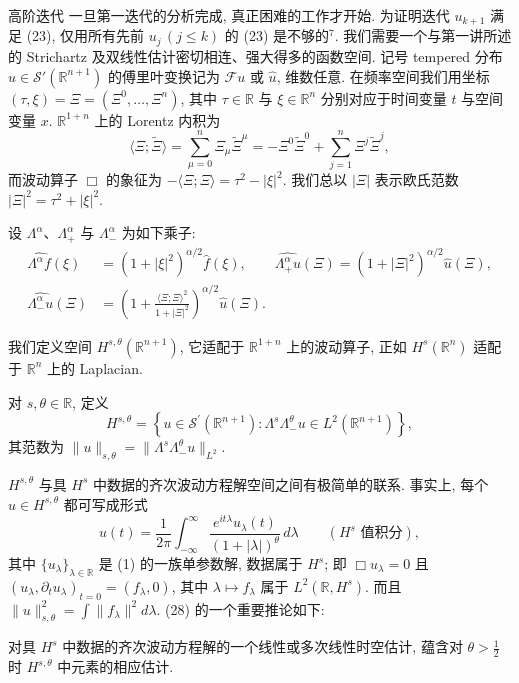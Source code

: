 高阶迭代 一旦第一迭代的分析完成, 真正困难的工作才开始. 为证明迭代 $u_{k+1}$ 满足 (23), 仅用所有先前 $u_j\,(j \leq k)$ 的 (23) 是不够的$^{7}$. 我们需要一个与第一讲所述的 Strichartz 及双线性估计密切相连、强大得多的函数空间.
记号  tempered 分布 $u \in \mathcal{S}'(\mathbb{R}^{n+1})$ 的傅里叶变换记为 $\mathcal{F}u$ 或 $\widehat{u}$, 维数任意. 在频率空间我们用坐标 $(\tau, \xi) = \Xi = (\Xi^0, \ldots, \Xi^n)$, 其中 $\tau \in \mathbb{R}$ 与 $\xi \in \mathbb{R}^n$ 分别对应于时间变量 $t$ 与空间变量 $x$. $\mathbb{R}^{1+n}$ 上的 Lorentz 内积为
\[
\langle\Xi;\widetilde{\Xi}\rangle=\sum_{\mu=0}^{n}\Xi_{\mu}\widetilde{\Xi}^{\mu}=-\Xi^{0}\widetilde{\Xi}^{0}+\sum_{j=1}^{n}\Xi^{j}\widetilde{\Xi}^{j},
\]
而波动算子 $\Box$ 的象征为 $-\langle \Xi;\Xi\rangle = \tau^2 - |\xi|^2$. 我们总以 $|\Xi|$ 表示欧氏范数 $|\Xi|^2 = \tau^2 + |\xi|^2$.
\begin{definition}\label{def:2.8}
设 $\Lambda^{\alpha}$、$\Lambda_{+}^{\alpha}$ 与 $\Lambda_{-}^{\alpha}$ 为如下乘子:
\begin{align}
\widehat{\Lambda^{\alpha}f}(\xi)&=\left(1+|\xi|^{2}\right)^{\alpha/2}\widehat{f}(\xi),\qquad
\widehat{\Lambda_{+}^{\alpha}u}(\Xi)=\left(1+|\Xi|^{2}\right)^{\alpha/2}\widehat{u}(\Xi),\nonumber\\
\widehat{\Lambda_{-}^{\alpha}u}(\Xi)&=\left(1+\frac{\langle\Xi;\Xi\rangle^{2}}{1+|\Xi|^{2}}\right)^{\alpha/2}\widehat{u}(\Xi).\end{align}
\end{definition}

我们定义空间 $H^{s,\theta}(\mathbb{R}^{n+1})$, 它适配于 $\mathbb{R}^{1+n}$ 上的波动算子, 正如 $H^{s}(\mathbb{R}^{n})$ 适配于 $\mathbb{R}^{n}$ 上的 Laplacian.
\begin{definition}\label{def:2.9}
对 $s, \theta \in \mathbb{R}$, 定义
\[
H^{s,\theta}=\left\{u\in\mathcal{S}^{\prime}(\mathbb{R}^{n+1}):\Lambda^{s}\Lambda_{-}^{\theta}u\in L^{2}(\mathbb{R}^{n+1})\right\},
\]
其范数为 $\|u\|_{s,\theta}=\|\Lambda^{s}\Lambda_{-}^{\theta}u\|_{L^{2}}$.\end{definition}

$H^{s,\theta}$ 与具 $H^s$ 中数据的齐次波动方程解空间之间有极简单的联系. 事实上, 每个 $u \in H^{s,\theta}$ 都可写成形式
\[
u(t)=\frac{1}{2\pi}\int_{-\infty}^{\infty}\frac{e^{i t\lambda}u_{\lambda}(t)}{(1+\left|\lambda\right|)^{\theta}}\,d\lambda\qquad(H^{s}\text{ 值积分}),
\]
其中 $\{u_\lambda\}_{\lambda\in\mathbb{R}}$ 是 (1) 的一族单参数解, 数据属于 $H^s$; 即 $\Box u_\lambda = 0$ 且 $(u_\lambda, \partial_t u_\lambda)_{t=0} = (f_\lambda, 0)$, 其中 $\lambda \mapsto f_\lambda$ 属于 $L^2(\mathbb{R}, H^s)$. 而且 $\|u\|_{s,\theta}^2 = \int \|f_\lambda\|^2 d\lambda$.
(28) 的一个重要推论如下:
\begin{theorem*}[原理]
对具 $H^{s}$ 中数据的齐次波动方程解的一个线性或多次线性时空估计, 蕴含对 $\theta > \frac{1}{2}$ 时 $H^{s,\theta}$ 中元素的相应估计.\end{theorem*}

